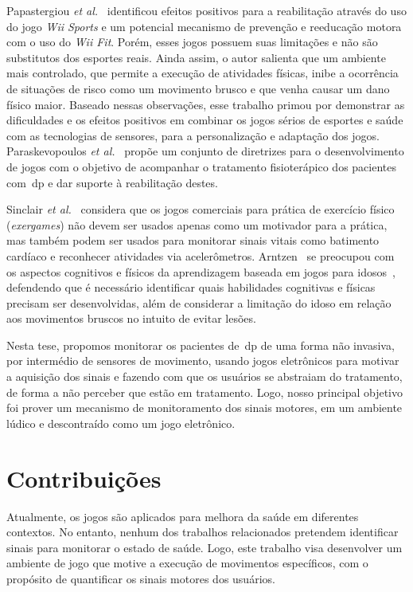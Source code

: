 Papastergiou \textit{et al.}~\cite{Papastergiou:2009:EPC:1570538.1570707} identificou efeitos positivos para a reabilitação através do uso do jogo \textit{Wii Sports} e um potencial mecanismo de prevenção e reeducação motora com o uso do \textit{Wii Fit}. Porém, esses jogos possuem suas limitações e não são substitutos dos esportes reais. Ainda assim, o autor salienta que um ambiente mais controlado, que permite a execução de atividades físicas, inibe a ocorrência de situações de risco como um movimento brusco e que venha causar um dano físico maior. Baseado nessas observações, esse trabalho primou por demonstrar as dificuldades e os efeitos positivos em combinar os jogos sérios de esportes e saúde com as tecnologias de sensores, para a personalização e adaptação dos jogos. Paraskevopoulos \textit{et al.}~\cite{sacbespoke2014} propõe um conjunto de diretrizes para o desenvolvimento de jogos com o objetivo de acompanhar o tratamento fisioterápico dos pacientes com~\ac{dp} e dar suporte à reabilitação destes.

Sinclair \textit{et al.}~\cite{Sinclair:2009:UVB:1515604.1515617} considera que os jogos comerciais para prática de exercício físico (\textit{exergames}) não devem ser usados apenas como um motivador para a prática, mas também podem ser usados para monitorar sinais vitais como batimento cardíaco e reconhecer atividades via acelerômetros. Arntzen~\cite{arntzen2011} se preocupou com os aspectos cognitivos e físicos da aprendizagem baseada em jogos para idosos~\cite{arntzen2011}, defendendo que é necessário identificar quais habilidades cognitivas e físicas precisam ser desenvolvidas, além de considerar a limitação do idoso em relação aos movimentos bruscos no intuito de evitar lesões.

Nesta tese, propomos monitorar os pacientes de~\ac{dp} de uma forma não invasiva, por intermédio de sensores de movimento, usando jogos eletrônicos para motivar a aquisição dos sinais e fazendo com que os usuários se abstraiam do tratamento, de forma a não perceber que estão em tratamento. Logo, nosso principal objetivo foi prover um mecanismo de monitoramento dos sinais motores, em um ambiente lúdico e descontraído como um jogo eletrônico.


\section{Contribuições}
Atualmente, os jogos são aplicados para melhora da saúde em diferentes contextos. No entanto, nenhum dos trabalhos relacionados pretendem identificar sinais para monitorar o estado de saúde. Logo, este trabalho visa desenvolver um ambiente de jogo que motive a execução de movimentos específicos, com o propósito de quantificar os sinais motores dos usuários.


